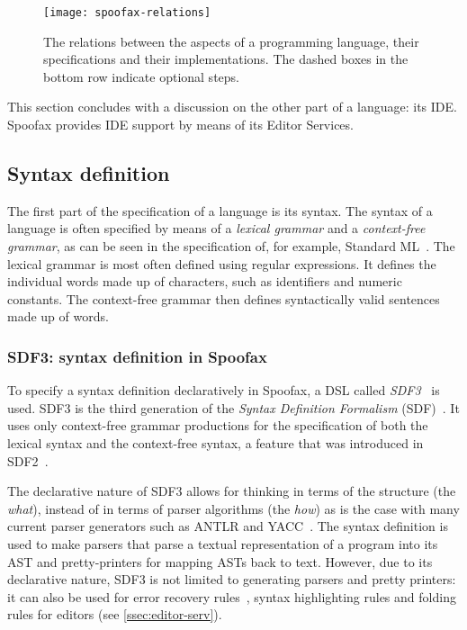 \begin{figure}[t]
  \centering
  \texttt{[image: spoofax-relations]}
  \caption{The relations between the aspects of a programming language, their
    specifications and their implementations. The dashed boxes in the bottom row
    indicate optional steps.}
  \label{fig:spoofax-relations}
\end{figure}

This section concludes with a discussion on the other part of a language: its
IDE. Spoofax provides IDE support by means of its Editor Services.

\subsection{Syntax definition}
\label{ssec:syntax-def}
The first part of the specification of a language is its syntax. The
syntax of a language is often specified by means of a \emph{lexical
grammar} and a \emph{context-free grammar}, as can be seen in the
specification of, for example, Standard ML~\cite{Milner97}. The
lexical grammar is most often defined using regular expressions. It
defines the individual words made up of characters, such as
identifiers and numeric constants. The context-free grammar then
defines syntactically valid sentences made up of words.

\subsubsection{SDF3: syntax definition in Spoofax}
\label{ssec:orgheadline1}
To specify a syntax definition declaratively in Spoofax, a DSL called
\emph{SDF3}~\cite{Vollebregt12} is used.  SDF3 is the third generation
of the \emph{Syntax Definition Formalism} (SDF)~\cite{Heering89}. It
uses only context-free grammar productions for the specification of
both the lexical syntax and the context-free syntax, a feature that
was introduced in SDF2~\cite{Visser97}.

The declarative nature of SDF3 allows for thinking in terms of the
structure (the \emph{what}), instead of in terms of parser algorithms (the
\emph{how}) as is the case with many current parser generators such as
ANTLR and YACC~\cite{Kats10b}. The syntax definition is used to
make parsers that parse a textual representation of a program into its
AST and pretty-printers for mapping ASTs back to text. However, due to
its declarative nature, SDF3 is not limited to generating parsers and
pretty printers: it can also be used for error recovery
rules~\cite{deJonge12}, syntax highlighting rules and folding
rules for editors (see \cref{ssec:editor-serv}).

